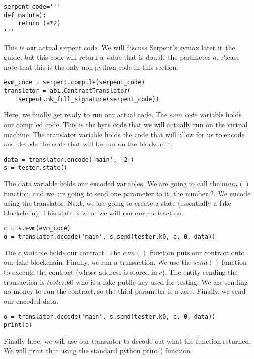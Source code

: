 \documentclass[12pt]{article}
\begin{document}
\begin{lstlisting}
serpent_code='''
def main(a):
	return (a*2)
'''
\end{lstlisting}

This is our actual serpent code. We will discuss Serpent's syntax later in the guide, but this code will return a value that is double the parameter $a$. Please note that this is the only non-python code in this section.

\begin{lstlisting}
evm_code = serpent.compile(serpent_code)
translator = abi.ContractTranslator(
	serpent.mk_full_signature(serpent_code))
\end{lstlisting}

Here, we finally get ready to run our actual code. The $evm\_code$ variable holds our compiled code. This is the byte code that we will actually run on the virtual machine. The translator variable holds the code that will allow for us to encode and decode the code that will be run on the blockchain.

\begin{lstlisting}
data = translator.encode('main', [2])
s = tester.state()
\end{lstlisting}

The data variable holds our encoded variables. We are going to call the $main()$ function, and we are going to send one parameter to it, the number 2. We encode using the translator. Next, we are going to create a state (essentially a fake blockchain). This state is what we will run our contract on. 

\begin{lstlisting}
c = s.evm(evm_code)
o = translator.decode('main', s.send(tester.k0, c, 0, data))
\end{lstlisting}

The $c$ variable holds our contract. The $evm()$ function puts our contract onto our fake blockchain. Finally, we run a transaction. We use the $send()$ function to execute the contract (whose address is stored in $c$). The entity sending the transaction is $tester.k0$ who is a fake public key used for testing. We are sending no money to run the contract, so the third parameter is a zero. Finally, we send our encoded data.

\begin{lstlisting}
o = translator.decode('main', s.send(tester.k0, c, 0, data))
print(o)
\end{lstlisting}

Finally here, we will use our translator to decode out what the function returned. We will print that using the standard python print() function.
\end{document}
